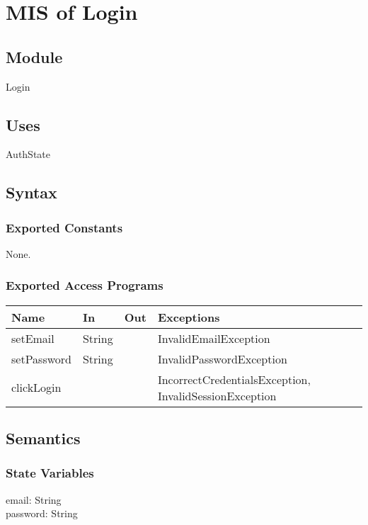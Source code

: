 \documentclass[12pt, titlepage]{article}
\begin{document}
\medskip
\newpage
\section{MIS of Login} \label{Login} 

\subsection{Module}

Login

\subsection{Uses}

AuthState

\subsection{Syntax}

\subsubsection{Exported Constants}
None.
\subsubsection{Exported Access Programs}

\begin{center}
\begin{tabular}{p{4cm} p{2cm} p{1cm} p{5cm}}
\hline
\textbf{Name} & \textbf{In} & \textbf{Out} & \textbf{Exceptions} \\
\hline
setEmail & String &  & InvalidEmailException \\ \hline
setPassword & String &  & InvalidPasswordException \\ \hline
clickLogin &  &  & IncorrectCredentialsException, InvalidSessionException \\
\hline
\end{tabular}
\end{center}

\subsection{Semantics}

\subsubsection{State Variables}
 email: String \\ 
password: String  \\ 
\end{document}
